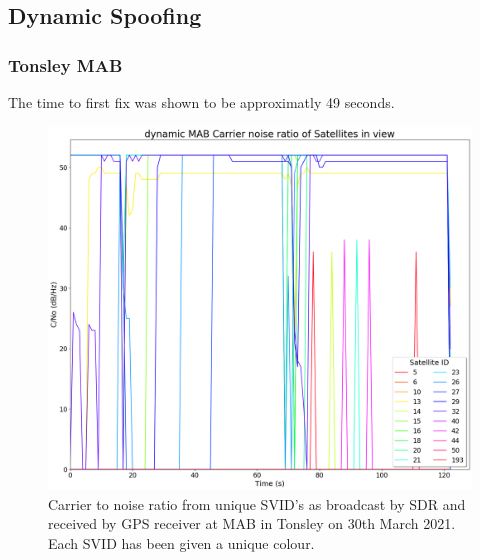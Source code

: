 \subsection{Dynamic Spoofing}

\subsubsection{Tonsley MAB}
The time to first fix was shown to be approximatly 49 seconds.


\begin{figure}[h]
    \begin{centering}
        \includegraphics[width=14cm,keepaspectratio]{Figures/2021_3_30_dynamic_MAB Carrier noise ratio.png}
        \caption{Carrier to noise ratio from unique SVID's as broadcast by SDR and received by GPS receiver at MAB in Tonsley on 30th March 2021. Each SVID has been given a unique colour.}
        \label{fig:MABdynamicCNo}
    \end{centering}
\end{figure}

